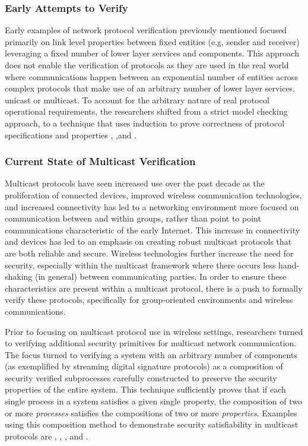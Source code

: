 \documentclass[10pt, journal]{IEEEtran}
\begin{document}
\subsubsection{Early Attempts to Verify}
Early examples of network protocol verification previously mentioned focused primarily on link level properties between fixed entities (e.g, sender and receiver) leveraging a fixed number of lower layer services and components. This approach does not enable the verification of protocols as they are used in the real world where communications happen between an exponential number of entities across complex protocols that make use of an arbitrary number of lower layer services, unicast or multicast. To account for the arbitrary nature of real protocol operational requirements, the researchers shifted from a strict model checking approach, to a technique that uses induction to prove correctness of protocol specifications and properties \cite{Creese1999}, \cite{Callahan1995} ,and \cite{Baptista1990}.

\subsubsection{Current State of Multicast Verification}
Multicast protocols have seen increased use over the past decade as the proliferation of connected devices, improved wireless communication technologies, and increased connectivity has led to a networking environment more focused on communication between and within groups, rather than point to point communications characteristic of the early Internet. This increase in connectivity and devices has led to an emphasis on creating robust multicast protocols that are both reliable and secure. Wireless technologies further increase the need for security, especially within the multicast framework where there occurs less hand-shaking (in general) between communicating parties. In order to ensure these characteristics are present within a multicast protocol, there is a push to formally verify these protocols, specifically for group-oriented environments and wireless communications. 

Prior to focusing on multicast protocol use in wireless settings, researchers turned to verifying additional security primitives for multicast network communication. The focus turned to verifying a system with an arbitrary number of components (as exemplified by streaming digital signature protocols) as a composition of security verified subprocesses carefully constructed to preserve the security properties of the entire system. This technique sufficiently proves that if each single process in a system satisfies a given single property, the composition of two or more \textit{processes} satisfies the compositions of two or more \textit{properties}. Examples using this composition method to demonstrate security satisfiability in multicast protocols are \cite{Gorrieri2008}, \cite{Martina2015}, \cite{Bella2002}, and \cite{Archer2002}.
\end{document}
